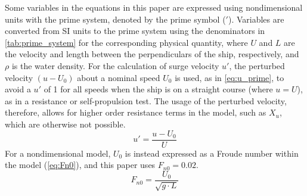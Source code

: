 Some variables in the equations in this paper are expressed using nondimensional units with the prime system, denoted by the prime symbol ($'$). Variables are converted from SI units to the prime system using the denominators in \autoref{tab:prime_system} for the corresponding physical quantity, where $U$ and $L$ are the velocity and length between the perpendiculars of the ship, respectively, and $\rho$ is the water density.
For the calculation of surge velocity $u'$, the perturbed velocity $(u-U_0)$ about a nominal speed $U_0$ is used, as in \autoref{eq:u_prime}, to avoid a $u'$ of 1 for all speeds when the ship is on a straight course (where $u=U$), as in a resistance or self-propulsion test. The usage of the perturbed velocity, therefore, allows for higher order resistance terms in the model, such as $X_{u}$, which are otherwise not possible. 
\begin{equation}
    \label{eq:u_prime}
    u' = \frac{u-U_0}{U}
\end{equation}
For a nondimensional model, $U_0$ is instead expressed as a Froude number within the model (\autoref{eq:Fn0}), and this paper uses $F_{n0}=0.02$.
\begin{equation}
    \label{eq:Fn0}
    F_{n0} = \frac{U_0}{\sqrt{g \cdot L}}
\end{equation}